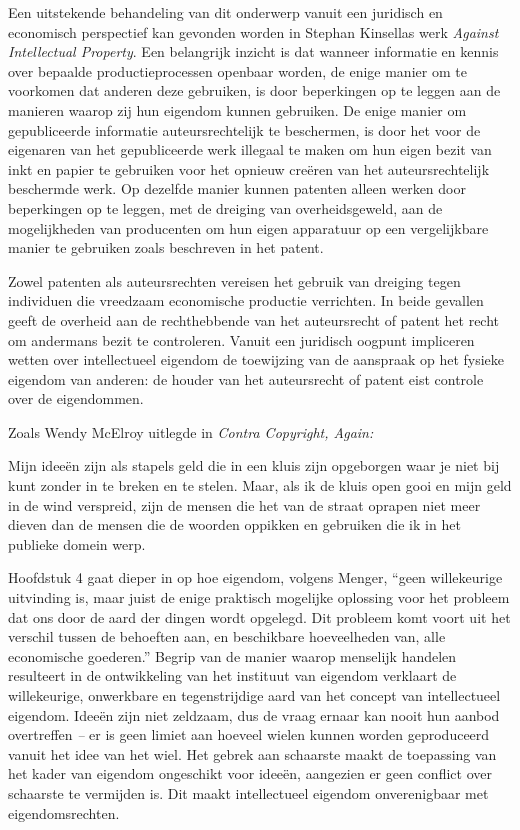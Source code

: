 Een uitstekende behandeling van dit onderwerp vanuit een juridisch en economisch perspectief kan gevonden worden in Stephan Kinsella\textquotesingle s werk \emph{Against Intellectual Property}. \autocite{85} Een belangrijk inzicht is dat wanneer informatie en kennis over bepaalde productieprocessen openbaar worden, de enige manier om te voorkomen dat anderen deze gebruiken, is door beperkingen op te leggen aan de manieren waarop zij hun eigendom kunnen gebruiken. De enige manier om gepubliceerde informatie auteursrechtelijk te beschermen, is door het voor de eigenaren van het gepubliceerde werk illegaal te maken om hun eigen bezit van inkt en papier te gebruiken voor het opnieuw creëren van het auteursrechtelijk beschermde werk. Op dezelfde manier kunnen patenten alleen werken door beperkingen op te leggen, met de dreiging van overheidsgeweld, aan de mogelijkheden van producenten om hun eigen apparatuur op een vergelijkbare manier te gebruiken zoals beschreven in het patent.

Zowel patenten als auteursrechten vereisen het gebruik van dreiging tegen individuen die vreedzaam economische productie verrichten. In beide gevallen geeft de overheid aan de rechthebbende van het auteursrecht of patent het recht om andermans bezit te controleren. Vanuit een juridisch oogpunt impliceren wetten over intellectueel eigendom de toewijzing van de aanspraak op het fysieke eigendom van anderen: de houder van het auteursrecht of patent eist controle over de eigendommen.

Zoals Wendy McElroy uitlegde in \emph{Contra Copyright, Again:}

\begin{blockquotebox}
    Mijn ideeën zijn als stapels geld die in een kluis zijn opgeborgen waar je niet bij kunt zonder in te breken en te stelen. Maar, als ik de kluis open gooi en mijn geld in de wind verspreid, zijn de mensen die het van de straat oprapen niet meer dieven dan de mensen die de woorden oppikken en gebruiken die ik in het publieke domein werp.\footnotemark
\end{blockquotebox}

Hoofdstuk 4 gaat dieper in op hoe eigendom, volgens Menger, ``geen willekeurige uitvinding is, maar juist de enige praktisch mogelijke oplossing voor het probleem dat ons door de aard der dingen wordt opgelegd. Dit probleem komt voort uit het verschil tussen de behoeften aan, en beschikbare hoeveelheden van, alle economische goederen.'' \autocite{87} Begrip van de manier waarop menselijk handelen resulteert in de ontwikkeling van het instituut van eigendom verklaart de willekeurige, onwerkbare en tegenstrijdige aard van het concept van intellectueel eigendom. Ideeën zijn niet zeldzaam, dus de vraag ernaar kan nooit hun aanbod overtreffen \emph{--} er is geen limiet aan hoeveel wielen kunnen worden geproduceerd vanuit het idee van het wiel. Het gebrek aan schaarste maakt de toepassing van het kader van eigendom ongeschikt voor ideeën, aangezien er geen conflict over schaarste te vermijden is. Dit maakt intellectueel eigendom onverenigbaar met eigendomsrechten.

